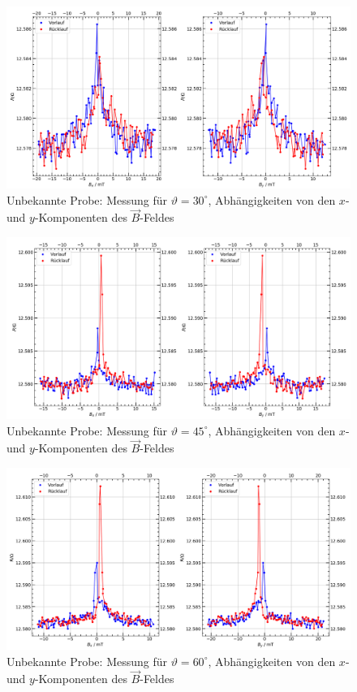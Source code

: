 \documentclass[german,  %
parskip=full,  %
]{scrartcl}
\begin{document}
\begin{figure}[h!]\centering
\includegraphics[width=\textwidth]{Probe3_30_Grad.png}
\caption{Unbekannte Probe: Messung für \(\vartheta=30^{\circ}\), Abhängigkeiten von den \(x\)- und \(y\)-Komponenten des \(\vec{B}\)-Feldes}
\end{figure} 
\begin{figure}[h!]\centering
\includegraphics[width=\textwidth]{Probe3_45_Grad.png}
\caption{Unbekannte Probe: Messung für \(\vartheta=45^{\circ}\), Abhängigkeiten von den \(x\)- und \(y\)-Komponenten des \(\vec{B}\)-Feldes}
\end{figure} 
\newpage
\begin{figure}[h!]\centering
\includegraphics[width=\textwidth]{Probe3_60_Grad.png}
\caption{Unbekannte Probe: Messung für \(\vartheta=60^{\circ}\), Abhängigkeiten von den \(x\)- und \(y\)-Komponenten des \(\vec{B}\)-Feldes}
\end{figure} 
\end{document}
